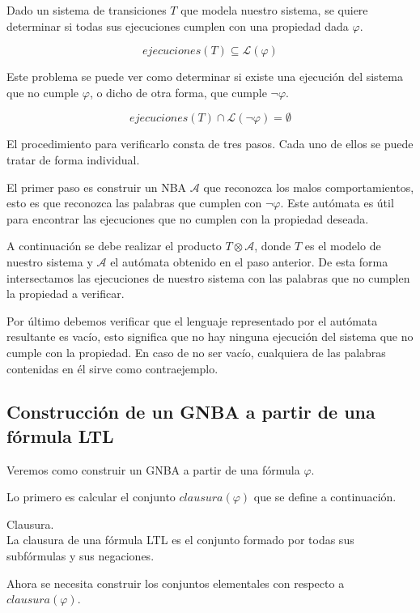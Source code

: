Dado un sistema de transiciones $T$ que modela nuestro sistema, se quiere determinar si todas sus ejecuciones
 cumplen con una propiedad dada $\varphi$.
 
\[ ejecuciones(T) \subseteq \mathcal{L} (\varphi) \]

Este problema se puede ver como determinar si existe una ejecución del sistema que no cumple $\varphi$,
 o dicho de otra forma, que cumple $\lnot \varphi$.

\[ ejecuciones(T) \cap \mathcal{L} (\lnot \varphi) = \emptyset \]

El procedimiento para verificarlo consta de tres pasos. Cada uno de ellos se puede tratar
 de forma individual.

El primer paso es construir un NBA $\mathcal{A}$ que reconozca los malos comportamientos, esto es
 que reconozca las palabras que cumplen con $\lnot \varphi$. Este autómata es útil para encontrar las
 ejecuciones que no cumplen con la propiedad deseada.

A continuación se debe realizar el producto $T \otimes \mathcal{A}$, donde $T$ es el modelo de nuestro sistema
 y $\mathcal{A}$ el autómata obtenido en el paso anterior. De esta forma intersectamos las ejecuciones
 de nuestro sistema con las palabras que no cumplen la propiedad a verificar.

Por último debemos verificar que el lenguaje representado por el autómata resultante es vacío, esto significa
 que no hay ninguna ejecución del sistema que no cumple con la propiedad. En caso de no ser vacío, cualquiera
 de las palabras contenidas en él sirve como contraejemplo.
 

\subsection{Construcción de un GNBA a partir de una fórmula LTL}

Veremos como construir un GNBA a partir de una fórmula $\varphi$.

Lo primero es calcular el conjunto $clausura( \varphi )$ que se define a continuación.

\begin{definicion}
Clausura. \\
La clausura de una fórmula LTL es el conjunto formado por todas sus subfórmulas y sus negaciones.
\end{definicion}

Ahora se necesita construir los conjuntos elementales con respecto a $clausura( \varphi )$.\\


